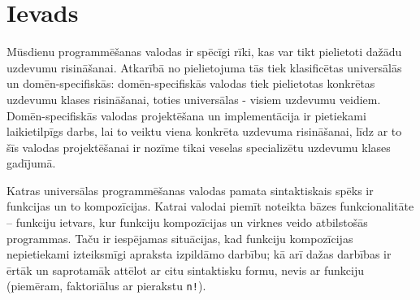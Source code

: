 \section*{Ievads}
\label{s:introduction}

Mūsdienu programmēšanas valodas ir spēcīgi rīki, kas var tikt pielietoti dažādu uzdevumu risināšanai. Atkarībā no pielietojuma tās tiek klasificētas universālās un domēn-specifiskās: domēn-specifiskās valodas tiek pielietotas konkrētas uzdevumu klases risināšanai, toties universālas - visiem uzdevumu veidiem. Domēn-specifiskās valodas projektēšana un implementācija ir pietiekami laikietilpīgs darbs, lai to veiktu viena konkrēta uzdevuma risināšanai, līdz ar to šīs valodas projektēšanai ir nozīme tikai veselas specializētu uzdevumu klases gadījumā.

Katras universālas programmēšanas valodas pamata sintaktiskais spēks ir funkcijas un to kompozīcijas. Katrai valodai piemīt noteikta bāzes funkcionalitāte  – funkciju ietvars, kur funkciju kompozīcijas un virknes veido atbilstošās programmas. Taču ir iespējamas situācijas, kad funkciju kompozīcijas nepietiekami izteiksmīgi apraksta izpildāmo darbību; kā arī dažas darbības ir ērtāk un saprotamāk attēlot ar citu sintaktisku formu, nevis ar funkciju (piemēram, faktoriālus ar pierakstu \verb|n!|).

